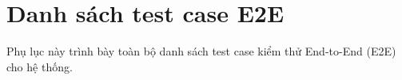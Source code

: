 \chapter{Danh sách test case E2E}

Phụ lục này trình bày toàn bộ danh sách test case kiểm thử End-to-End (E2E) cho hệ thống.


\pagestyle{thesis}
